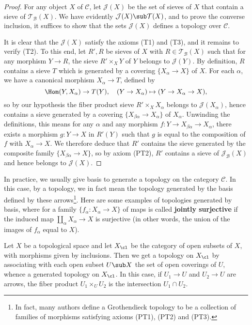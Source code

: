 \begin{proof}
For any object $X$ of $\mathcal{C}$, let $\mathcal{J}(X)$ be the set of sieves of $X$ that contain a sieve of $\mathcal{T}_{\mathcal{B}}(X)$. We have evidently $\mathcal{J}(X)\sub\mathcal{T}(X)$, and to prove the converse inclusion, it suffices to show that the sets $\mathcal{J}(X)$ defines a topology over $\mathcal{C}$.\par
It is clear that the $\mathcal{J}(X)$ satisfy the axioms (T1) and (T3), and it remains to verify (T2). To this end, let $R',R$ be sieves of $X$ with $R\in\mathcal{T}_\mathcal{B}(X)$ such that for any morphism $Y\to R$, the sieve $R'\times_XY$ of $Y$ belongs to $\mathcal{J}(Y)$. By definition, $R$ contains a sieve $T$ which is generated by a covering $\{X_\alpha\to X\}$ of $X$. For each $\alpha$, we have a canonical morphism $X_\alpha\to T$, defined by
\[\Hom(Y,X_\alpha)\to T(Y),\quad (Y\to X_\alpha)\mapsto(Y\to X_\alpha\to X),\]
so by our hypothesis the fiber product sieve $R'\times_XX_\alpha$ belongs to $\mathcal{J}(X_\alpha)$, hence contains a sieve generated by a covering $\{X_{\beta\alpha}\to X_\alpha\}$ of $X_\alpha$. Unwinding the definitions, this means for any $\alpha$ and any morphism $f:Y\to X_{\beta\alpha}\to X_\alpha$, there exists a morphism $g:Y\to X$ in $R'(Y)$ such that $g$ is equal to the composition of $f$ with $X_\alpha\to X$. We therefore deduce that $R'$ contains the sieve generated by the composite family $\{X_{\beta\alpha}\to X\}$, so by axiom (PT2), $R'$ contains a sieve of $\mathcal{J}_\mathcal{B}(X)$ and hence belongs to $\mathcal{J}(X)$.
\end{proof}
In practice, we usually give basis to generate a topology on the category $\mathcal{C}$. In this case, by a topology, we in fact mean the topology generated by the basis defined by these arrows\footnote{In fact, many authors define a Grothendieck topology to be a collection of families of morphisms satisfying axioms (PT1), (PT2) and (PT3).}. Here are some examples of topologies generated by basis, where for a family $\{f_\alpha:X_\alpha\to X\}$ of maps is called \textbf{jointly surjective} if the induced map $\coprod_\alpha X_\alpha\to X$ is surjective (in other words, the union of the images of $f_\alpha$ equal to $X$).
\begin{example}
Let $X$ be a topological space and let $X_{\cl}$ be the category of open subsets of $X$, with morphisms given by inclusions. Then we get a topology on $X_{\cl}$ by associating with each open subset $U\sub X$ the set of open coverings of $U$, whence a generated topology on $X_{\cl}$. In this case, if $U_1\to U$ and $U_2\to U$ are arrows, the fiber product $U_1\times_UU_2$ is the intersection $U_1\cap U_2$.
\end{example}
